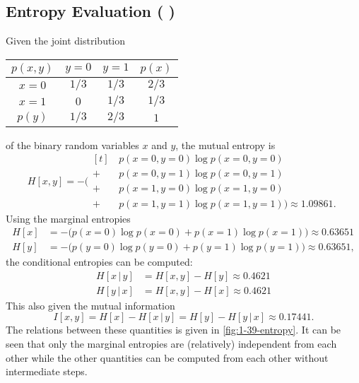 \documentclass[11pt, a4paper]{scrartcl}
\newcommand{\given}{\,\vert\,}
\newcommand{\diffstar}{\texorpdfstring{\raisebox{-1pt}{\resizebox{!}{8pt}{\(\star\)}}}{*}}
\newcommand{\threestar}{(\diffstar\,\diffstar\,\diffstar)}
\begin{document}
		\subsection{Entropy Evaluation  \threestar}
			Given the joint distribution
			\begin{center}
				\begin{tabular}{c|cc|c}
					\( p(x, y) \) & \( y = 0 \) & \( y = 1 \) & \( p(x) \) \\ \hline
					 \( x = 0 \)  &   \(1/3\)   &   \(1/3\)   &  \(2/3\)   \\
					 \( x = 1 \)  &    \(0\)    &   \(1/3\)   &  \(1/3\)   \\ \hline
					 \( p(y) \)   &   \(1/3\)   &   \(2/3\)   &   \(1\)
				\end{tabular}
			\end{center}
			of the binary random variables \(x\) and \(y\), the mutual entropy is
			\begin{equation}
				H[x, y] = -\big(
					\begin{aligned}[t]
						 &\, p(x = 0, y = 0) \log p(x = 0, y = 0) \\
						+&\, p(x = 0, y = 1) \log p(x = 0, y = 1) \\
						+&\, p(x = 1, y = 0) \log p(x = 1, y = 0) \\
						+&\, p(x = 1, y = 1) \log p(x = 1, y = 1) \big) \approx 1.09861.
					\end{aligned}
			\end{equation}
			Using the marginal entropies
			\begin{align}
				H[x] &= -\big( p(x = 0) \log p(x = 0) + p(x = 1) \log p(x = 1) \big) \approx 0.63651 \\
				H[y] &= -\big( p(y = 0) \log p(y = 0) + p(y = 1) \log p(y = 1) \big) \approx 0.63651,
			\end{align}
			the conditional entropies can be computed:
			\begin{align}
				H[x \given y] &= H[x, y] - H[y] \approx 0.4621 \\
				H[y \given x] &= H[x, y] - H[x] \approx 0.4621
			\end{align}
			This also given the mutual information
			\begin{equation}
				I[x, y] = H[x] - H[x \given y] = H[y] - H[y \given x] \approx 0.17441.
			\end{equation}
			The relations between these quantities is given in \autoref{fig:1-39-entropy}. It can be seen that only the marginal entropies are (relatively) independent from each other while the other quantities can be computed from each other without intermediate steps.
\end{document}
